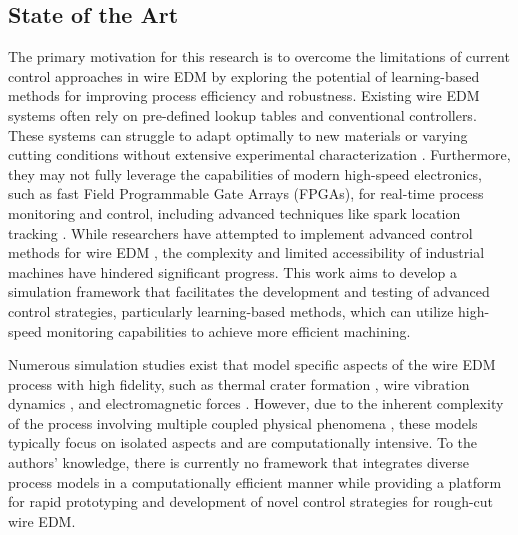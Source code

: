 \documentclass[5p,times,procedia]{elsarticle}
\begin{document}
\subsection{State of the Art}
The primary motivation for this research is to overcome the limitations of current control approaches in wire EDM by exploring the potential of learning-based methods for improving process efficiency and robustness. Existing wire EDM systems often rely on pre-defined lookup tables and conventional controllers. These systems can struggle to adapt optimally to new materials or varying cutting conditions without extensive experimental characterization \cite{almeida2022servo}. Furthermore, they may not fully leverage the capabilities of modern high-speed electronics, such as fast Field Programmable Gate Arrays (FPGAs), for real-time process monitoring and control, including advanced techniques like spark location tracking \cite{sparktrack2018}. While researchers have attempted to implement advanced control methods for wire EDM \cite{yan1998adaptive, liao2000design, lee2007adaptive}, the complexity and limited accessibility of industrial machines have hindered significant progress. This work aims to develop a simulation framework that facilitates the development and testing of advanced control strategies, particularly learning-based methods, which can utilize high-speed monitoring capabilities to achieve more efficient machining.

Numerous simulation studies exist that model specific aspects of the wire EDM process with high fidelity, such as thermal crater formation \cite{weingartner_modeling_2012}, wire vibration dynamics \cite{shibata_simulation_2022, sawada_development_2022}, and electromagnetic forces \cite{di_campli_real-time_2020}. However, due to the inherent complexity of the process involving multiple coupled physical phenomena \cite{zivanovic_wire_2016}, these models typically focus on isolated aspects and are computationally intensive. To the authors' knowledge, there is currently no framework that integrates diverse process models in a computationally efficient manner while providing a platform for rapid prototyping and development of novel control strategies for rough-cut wire EDM.
\end{document}
